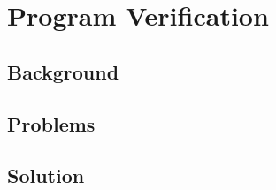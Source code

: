 \chapter{\;\;\;\;Program Verification}
\label{sec:program}

\section{Background}
\label{sec:program:background}

\section{Problems}
\label{sec:program:problems}

\section{Solution}
\label{sec:program:solution}

